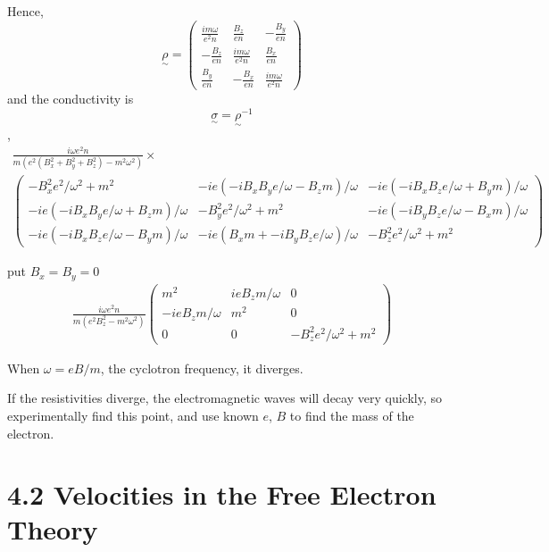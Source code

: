 \documentclass[a4paper,11pt]{article}
\begin{document}
Hence,
\begin{equation}
    \underset{\sim}{\rho} = \begin{pmatrix}
        \frac{im\omega}{e^2 n} & \frac{B_z}{en} & -\frac{B_y}{en}\\
        -\frac{B_z}{en} & \frac{im\omega}{e^2 n} & \frac{B_x}{en} \\
        \frac{B_y}{en} & -\frac{B_x}{en} & \frac{im\omega}{e^2 n} 
    \end{pmatrix}
\end{equation}
and the conductivity is $$\underset{\sim}{\sigma} = \underset{\sim}{\rho}^{-1}$$, 
\begin{multline}
    \frac{i\omega e^{2} n}{m \left(e^{2} \left(B_{x}^{2} + B_{y}^{2} + B_{z}^{2}\right) - m^{2}\omega^2\right)} \times \\
    \begin{pmatrix}
    -B_{x}^{2} 
    e^{2}/\omega^2 + m^{2} 
    & -i e \left(-iB_{x} B_{y} e/\omega - B_{z} m\right)/\omega 
    & -i e \left(-iB_{x} B_{z} e/\omega + B_{y} m\right)/\omega\\
    -i e \left(-iB_{x} B_{y} e/\omega + B_{z} m\right)/\omega 
    & -B_{y}^{2} e^{2}/\omega^2 + m^{2} 
    & -i e \left(-iB_{y} B_{z} e/\omega - B_{x} m\right)/\omega\\
    -i e \left(-iB_{x} B_{z} e/\omega - B_{y} m\right)/\omega 
    & -i e \left(B_{x} m + -iB_{y} B_{z} e/\omega\right)/\omega 
    & -B_{z}^{2} e^{2}/\omega^2 + m^{2}
    \end{pmatrix}
\end{multline}

put $B_x=B_y=0$
\begin{gather}
    \frac{i\omega e^{2} n}{m \left(e^{2} B_{z}^{2} - m^{2}\omega^2\right)} 
    \begin{pmatrix}
    m^{2} & ie B_{z} m/\omega & 0\\
    -ie B_{z} m/\omega & m^{2} & 0\\
    0 & 0 & -B_{z}^{2} e^{2}/\omega^2 + m^{2}
    \end{pmatrix}
\end{gather}

When $\omega = eB/m$, the cyclotron frequency, it diverges. 

If the resistivities diverge, the electromagnetic waves will decay very quickly, so experimentally find this point, and use known $e$, $B$ to find the mass of the electron. 

\section{4.2 Velocities in the Free Electron Theory}
\end{document}

